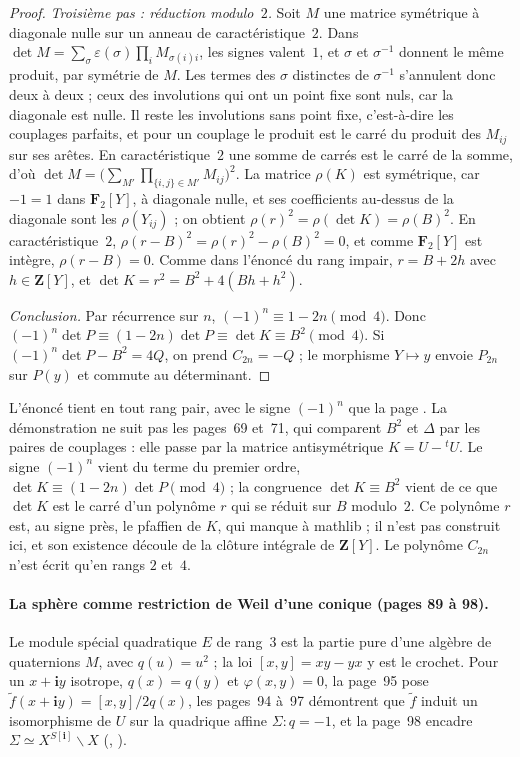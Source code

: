 \begin{proof}
\emph{Troisième pas : réduction modulo~$2$.} Soit $M$ une matrice symétrique à diagonale nulle sur un anneau de caractéristique~$2$. Dans $\det M = \sum_\sigma \varepsilon(\sigma) \prod_i M_{\sigma(i) i}$, les signes valent~$1$, et $\sigma$ et $\sigma^{-1}$ donnent le même produit, par symétrie de $M$. Les termes des $\sigma$ distinctes de $\sigma^{-1}$ s'annulent donc deux à deux ; ceux des involutions qui ont un point fixe sont nuls, car la diagonale est nulle. Il reste les involutions sans point fixe, c'est-à-dire les couplages parfaits, et pour un couplage le produit est le carré du produit des $M_{ij}$ sur ses arêtes. En caractéristique~$2$ une somme de carrés est le carré de la somme, d'où $\det M = \bigl(\sum_{M'} \prod_{\{i, j\} \in M'} M_{ij}\bigr)^2$. La matrice $\rho(K)$ est symétrique, car $-1 = 1$ dans $\mathbf F_2[Y]$, à diagonale nulle, et ses coefficients au-dessus de la diagonale sont les $\rho(Y_{ij})$ ; on obtient $\rho(r)^2 = \rho(\det K) = \rho(B)^2$. En caractéristique~$2$, $\rho(r - B)^2 = \rho(r)^2 - \rho(B)^2 = 0$, et comme $\mathbf F_2[Y]$ est intègre, $\rho(r - B) = 0$. Comme dans l'énoncé du rang impair, $r = B + 2h$ avec $h \in \mathbf Z[Y]$, et $\det K = r^2 = B^2 + 4(Bh + h^2)$.

\emph{Conclusion.} Par récurrence sur $n$, $(-1)^n \equiv 1 - 2n \pmod 4$. Donc $(-1)^n \det P \equiv (1 - 2n) \det P \equiv \det K \equiv B^2 \pmod 4$. Si $(-1)^n \det P - B^2 = 4Q$, on prend $C_{2n} = -Q$ ; le morphisme $Y \mapsto y$ envoie $P_{2n}$ sur $P(y)$ et commute au déterminant.
\end{proof}

\begin{remarque}
L'énoncé tient en tout rang pair, avec le signe $(-1)^n$ que la page . La démonstration ne suit pas les pages~69 et~71, qui comparent $B^2$ et $\Delta$ par les paires de couplages : elle passe par la matrice antisymétrique $K = U - {}^tU$. Le signe $(-1)^n$ vient du terme du premier ordre, $\det K \equiv (1 - 2n) \det P \pmod 4$ ; la congruence $\det K \equiv B^2$ vient de ce que $\det K$ est le carré d'un polynôme $r$ qui se réduit sur $B$ modulo~$2$. Ce polynôme $r$ est, au signe près, le pfaffien de $K$, qui manque à mathlib ; il n'est pas construit ici, et son existence découle de la clôture intégrale de $\mathbf Z[Y]$. Le polynôme $C_{2n}$ n'est écrit qu'en rangs $2$ et~$4$.
\end{remarque}

\paragraph{La sphère comme restriction de Weil d'une conique (pages 89 à 98).} Le module spécial quadratique $E$ de rang~$3$ est la partie pure d'une algèbre de quaternions $M$, avec $q(u) = u^2$ ; la loi $[x, y] = xy - yx$ y est le crochet. Pour un $x + \mathbf i y$ isotrope, $q(x) = q(y)$ et $\varphi(x, y) = 0$, la page~95 pose $\tilde f(x + \mathbf i y) = [x, y]/2q(x)$, les pages~94 à~97 démontrent que $\tilde f$ induit un isomorphisme de $U$ sur la quadrique affine $\Sigma : q = -1$, et la page~98 encadre $\Sigma \simeq X^{S[\mathbf i]} \smallsetminus X$ (, ).

